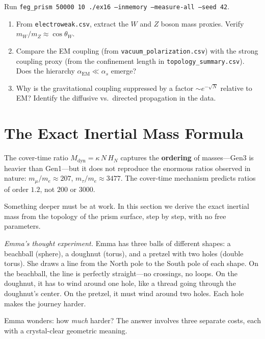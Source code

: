 \documentclass[11pt, a4paper, openany]{book}
\begin{document}
\begin{simulation}
Run \texttt{feg\_prism 50000 10 ./ex16 --inmemory --measure-all --seed 42}.
\begin{enumerate}
\item From \texttt{electroweak.csv}, extract the $W$ and $Z$ boson mass proxies. Verify $m_W/m_Z \approx \cos\theta_W$.
\item Compare the EM coupling (from \texttt{vacuum\_polarization.csv}) with the strong coupling proxy (from the confinement length in \texttt{topology\_summary.csv}). Does the hierarchy $\alpha_{\mathrm{EM}} \ll \alpha_s$ emerge?
\item Why is the gravitational coupling suppressed by a factor $\sim\! e^{-\sqrt{N}}$ relative to EM? Identify the diffusive vs.\ directed propagation in the data.
\end{enumerate}
\end{simulation}


\section{The Exact Inertial Mass Formula}
\label{sec:exact-mass}

The cover-time ratio $M_{\mathrm{dyn}} = \kappa\,N\,H_N$ captures the
\textbf{ordering} of masses---Gen3 is heavier than Gen1---but it does not
reproduce the enormous ratios observed in nature:
$m_\mu/m_e \approx 207$, $m_\tau/m_e \approx 3477$. The
cover-time mechanism predicts ratios of order $1.2$, not $200$ or $3000$.

Something deeper must be at work. In this section we derive the exact
inertial mass from the topology of the prism surface, step by step,
with no free parameters.

\smallskip\noindent
\textit{Emma's thought experiment.}
Emma has three balls of different shapes: a beachball (sphere),
a doughnut (torus), and a pretzel with two holes (double torus).
She draws a line from the North pole to the South pole of each shape.
On the beachball, the line is perfectly straight---no crossings,
no loops.  On the doughnut, it has to wind around one hole, like a
thread going through the doughnut's center. On the pretzel, it must
wind around two holes. Each hole makes the journey harder.

Emma wonders: how \emph{much} harder? The answer involves three
separate costs, each with a crystal-clear geometric meaning.
\smallskip
\end{document}
